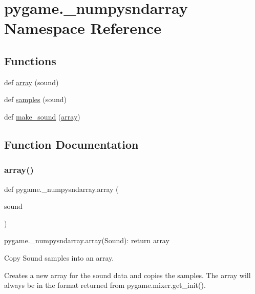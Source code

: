 \hypertarget{namespacepygame_1_1__numpysndarray}{}\section{pygame.\+\_\+numpysndarray Namespace Reference}
\label{namespacepygame_1_1__numpysndarray}
\subsection*{Functions}
\begin{DoxyCompactItemize}
\item 
def \hyperlink{namespacepygame_1_1__numpysndarray_a5ce2cbcb07242a70d9b65fff19801ade}{array} (sound)
\item 
def \hyperlink{namespacepygame_1_1__numpysndarray_a9c6c1a49e395ab900de24c97a1cbfa47}{samples} (sound)
\item 
def \hyperlink{namespacepygame_1_1__numpysndarray_a74934489a13e92a8a7f865e1eb91bda0}{make\+\_\+sound} (\hyperlink{namespacepygame_1_1__numpysndarray_a5ce2cbcb07242a70d9b65fff19801ade}{array})
\end{DoxyCompactItemize}


\subsection{Function Documentation}
\mbox{\label{namespacepygame_1_1__numpysndarray_a5ce2cbcb07242a70d9b65fff19801ade}} 
\subsubsection{\texorpdfstring{array()}{array()}}
{\footnotesize\ttfamily def pygame.\+\_\+numpysndarray.\+array (\begin{DoxyParamCaption}\item[{}]{sound }\end{DoxyParamCaption})}

\begin{DoxyVerb}pygame._numpysndarray.array(Sound): return array

Copy Sound samples into an array.

Creates a new array for the sound data and copies the samples. The
array will always be in the format returned from
pygame.mixer.get_init().
\end{DoxyVerb}
 \mbox{\label{namespacepygame_1_1__numpysndarray_a74934489a13e92a8a7f865e1eb91bda0}} 
